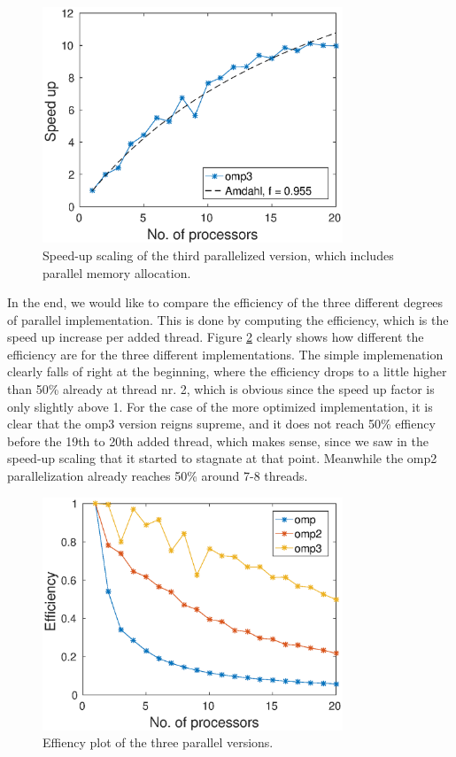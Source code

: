 \begin{figure}[h!]
\centering
\includegraphics[width = 0.8\textwidth]{fig/speedup_omp3.eps}
\caption{Speed-up scaling of the third parallelized version, which includes parallel memory allocation.}
\label{fig:omp3_scale}
\end{figure}


In the end, we would like to compare the efficiency of the three different degrees of parallel implementation. This is done by computing the efficiency, which is the speed up increase per added thread. Figure \ref{fig:omp_eff} clearly shows how different the efficiency are for the three different implementations. The simple implemenation clearly falls of right at the beginning, where the efficiency drops to a little higher than 50\% already at thread nr. 2, which is obvious since the speed up factor is only slightly above 1. For the case of the more optimized implementation, it is clear that the omp3 version reigns supreme, and it does not reach 50\% effiency before the 19th to 20th added thread, which makes sense, since we saw in the speed-up scaling that it started to stagnate at that point. Meanwhile the omp2 parallelization already reaches 50\% around 7-8 threads.

\begin{figure}[h!]
\centering
\includegraphics[width = 0.8\textwidth]{fig/efficiency_omp_omp2_omp3.eps}
\caption{Effiency plot of the three parallel versions.}
\label{fig:omp_eff}
\end{figure}
